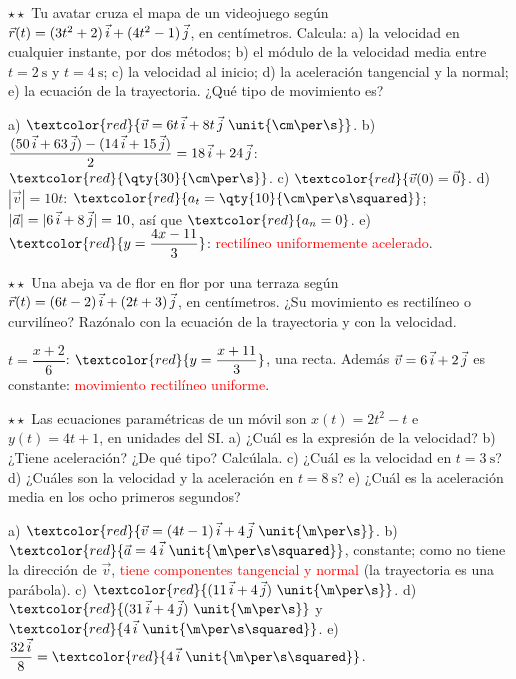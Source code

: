 \begin{exercise}
    \(\star\star\) Tu avatar cruza el mapa de un videojuego según \(\vec r(t) = (3t^2 + 2)\,\vec{i} + (4t^2 - 1)\,\vec{j}\), en
    centímetros. Calcula: a) la velocidad en cualquier instante, por dos métodos; b) el módulo de la velocidad media entre
    \(t = \qty{2}{\s}\) y \(t = \qty{4}{\s}\); c) la velocidad al inicio; d) la aceleración tangencial y la normal; e) la ecuación de
    la trayectoria. ¿Qué tipo de movimiento es?
    \begin{solu}
        a) \(\textcolor{red}{\vec v = 6t\,\ivec + 8t\,\jvec~\unit{\cm\per\s}}\). b) \(\dfrac{(50\,\vec{i} + 63\,\vec{j}) - (14\,\vec{i} + 15\,\vec{j})}{2} =
        18\,\vec{i} + 24\,\vec{j}\): \(\textcolor{red}{\qty{30}{\cm\per\s}}\). c) \(\textcolor{red}{\vec v(0) = \vec 0}\).
        d) \(|\vec v| = 10t\): \(\textcolor{red}{a_t = \qty{10}{\cm\per\s\squared}}\); \(|\vec a| = |6\,\vec{i} + 8\,\vec{j}| = 10\), así que
        \(\textcolor{red}{a_n = 0}\). e) \(\textcolor{red}{y = \dfrac{4x - 11}{3}}\): \textcolor{red}{rectilíneo uniformemente acelerado}.
    \end{solu}
\end{exercise}

\begin{exercise}
    \(\star\star\) Una abeja va de flor en flor por una terraza según \(\vec r(t) = (6t - 2)\,\vec{i} + (2t + 3)\,\vec{j}\), en
    centímetros. ¿Su movimiento es rectilíneo o curvilíneo? Razónalo con la ecuación de la trayectoria y con la velocidad.
    \begin{solu}
        \(t = \dfrac{x + 2}{6}\): \(\textcolor{red}{y = \dfrac{x + 11}{3}}\), una recta. Además \(\vec v = 6\,\vec{i} + 2\,\vec{j}\) es
        constante: \textcolor{red}{movimiento rectilíneo uniforme}.
    \end{solu}
\end{exercise}

\begin{exercise}
    \(\star\star\) Las ecuaciones paramétricas de un móvil son \(x(t) = 2t^2 - t\) e \(y(t) = 4t + 1\), en unidades del SI.
    a) ¿Cuál es la expresión de la velocidad? b) ¿Tiene aceleración? ¿De qué tipo? Calcúlala. c) ¿Cuál es la velocidad en
    \(t = \qty{3}{\s}\)? d) ¿Cuáles son la velocidad y la aceleración en \(t = \qty{8}{\s}\)? e) ¿Cuál es la aceleración media en
    los ocho primeros segundos?
    \begin{solu}
        a) \(\textcolor{red}{\vec v = (4t - 1)\,\ivec + 4\,\jvec~\unit{\m\per\s}}\). b) \(\textcolor{red}{\vec a = 4\,\ivec~\unit{\m\per\s\squared}}\),
        constante; como no tiene la dirección de \(\vec v\), \textcolor{red}{tiene componentes tangencial y normal} (la trayectoria
        es una parábola). c) \(\textcolor{red}{(11\,\ivec + 4\,\jvec)~\unit{\m\per\s}}\). d) \(\textcolor{red}{(31\,\ivec + 4\,\jvec)~\unit{\m\per\s}}\)
        y \(\textcolor{red}{4\,\ivec~\unit{\m\per\s\squared}}\). e) \(\dfrac{32\,\ivec}{8} = \textcolor{red}{4\,\ivec~\unit{\m\per\s\squared}}\).
    \end{solu}
\end{exercise}

